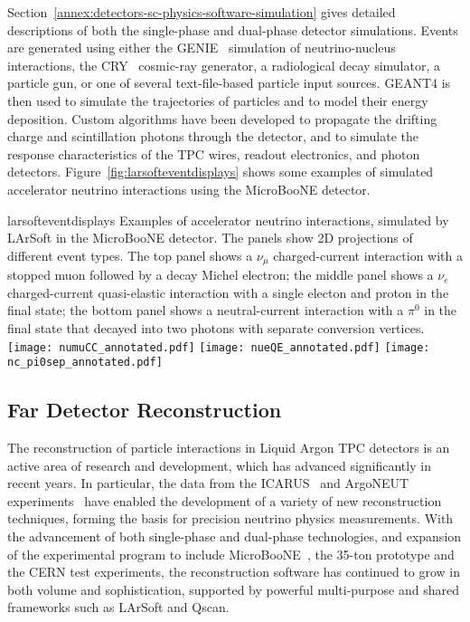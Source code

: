 Section~\ref{annex:detectors-sc-physics-software-simulation} gives detailed
descriptions of both the single-phase and dual-phase detector simulations.
Events are generated using either the GENIE~\cite{GENIE} simulation of 
neutrino-nucleus interactions, the CRY~\cite{Cosmic-CRY,Cosmic-CRY-protons,CRY-url} cosmic-ray generator, 
a radiological decay simulator, a particle gun, or one of several
text-file-based particle input sources. GEANT4 is then used to simulate the trajectories
of particles and to model their energy deposition.  
Custom algorithms have been developed to propagate the drifting charge
and scintillation photons through the detector, and to simulate the
response characteristics of the TPC wires, readout electronics, and photon detectors.
Figure~\ref{fig:larsofteventdisplays} shows some examples of simulated 
accelerator neutrino interactions using the MicroBooNE detector.

\begin{cdrfigure}{larsofteventdisplays}
{Examples of accelerator neutrino interactions, simulated by LArSoft in the 
MicroBooNE detector. The panels show 2D projections of different event types.
The top panel shows a $\nu_{\mu}$ charged-current interaction with a stopped muon followed
by a decay Michel electron; the middle panel shows a $\nu_{e}$ charged-current 
quasi-elastic interaction with a single electon and proton in the final state;
the bottom panel shows a neutral-current interaction with a $\pi^{0}$ in the final state
that decayed into two photons with separate conversion vertices.}
\texttt{[image: numuCC\_annotated.pdf]}
\texttt{[image: nueQE\_annotated.pdf]}
\texttt{[image: nc\_pi0sep\_annotated.pdf]}
\end{cdrfigure}

\subsection{Far Detector Reconstruction}
\label{sec:detectors-sc-physics-software-reconstruction-fd}

The reconstruction of particle interactions in Liquid Argon TPC
detectors is an active area of research and development,
which has advanced significantly in recent years.
In particular, the data from the ICARUS~\cite{Amerio:2004ze,icarus-url,ICARUS-pizero,Antonello:2012hu} 
and ArgoNEUT experiments~\cite{Adamson:2013/02/28tla,argoneut-url,Acciarri:2013met}
have enabled the development of a variety of new reconstruction techniques,
forming the basis for precision neutrino physics measurements.
With the advancement of both single-phase and dual-phase technologies,
and expansion of the experimental program to include MicroBooNE~\cite{Chen:2007ae,microboone-url},
the 35-ton prototype and the CERN test experiments,
the reconstruction software has continued to grow in both volume and sophistication,
supported by powerful multi-purpose and shared frameworks 
such as LArSoft and Qscan.

